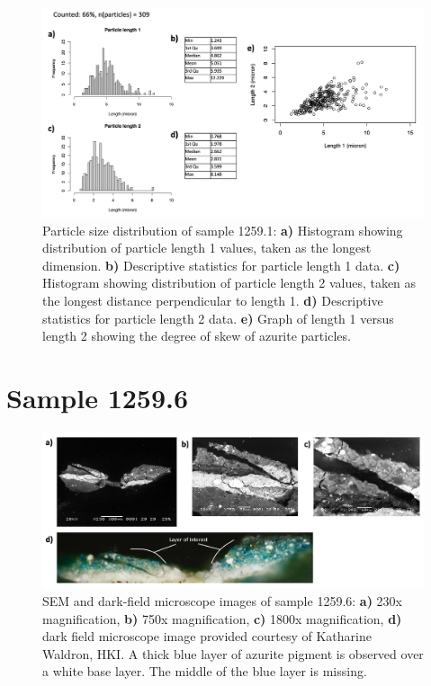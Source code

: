 \begin{figure}[H]
\centering
  \includegraphics[width=0.8\linewidth]{1259.1_partsize}
\caption[Particle size distribution, sample 1259.1.]{Particle size distribution of sample 1259.1: \textbf{a)} Histogram showing distribution of particle length 1 values, taken as the longest dimension. \textbf{b)} Descriptive statistics for particle length 1 data. \textbf{c)} Histogram showing distribution of particle length 2 values, taken as the longest distance perpendicular to length 1. \textbf{d)} Descriptive statistics for particle length 2 data. \textbf{e)} Graph of length 1 versus length 2 showing the degree of skew of azurite particles.}
\label{fig:1259.1_partsize}
\end{figure}




\section{Sample 1259.6}

\begin{figure}[H]
  \centering
  \includegraphics[width=0.8\linewidth]{1259.6_imgs}
\caption[SEM and dark-field microscope images of sample 1259.6.]{SEM and dark-field microscope images of sample 1259.6: \textbf{a)} 230x magnification, \textbf{b)} 750x magnification, \textbf{c)} 1800x magnification, \textbf{d)} dark field microscope image provided courtesy of Katharine Waldron, HKI. A thick blue layer of azurite pigment is observed over a white base layer. The middle of the blue layer is missing.}
\label{fig:1259.6_imgs}
\end{figure}


